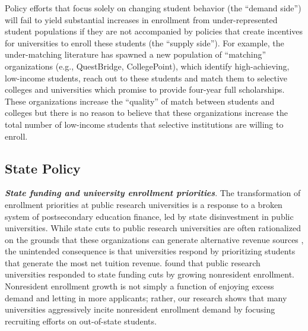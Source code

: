 \documentclass[twoside]{article}
\begin{document}
Policy efforts that focus solely on changing student behavior (the ``demand side'') will fail to yield substantial increases in enrollment from under-represented student populations if they are not accompanied by policies that create incentives for universities to enroll these students (the ``supply side'').  For example, the under-matching literature has spawned a new population of ``matching'' organizations (e.g., QuestBridge, CollegePoint), which identify high-achieving, low-income students, reach out to these students and match them to selective colleges and universities which promise to provide four-year full scholarships.  These organizations increase the ``quality'' of match between students and colleges but there is no reason to believe that these organizations increase the total number of low-income students that selective institutions are willing to enroll.

\subsection*{State Policy}

\textbf{\textit{State funding and university enrollment priorities}}. The transformation of enrollment priorities at public research universities is a response to a broken system of postsecondary education finance, led by state disinvestment in public universities.  While state cuts to public research universities are often rationalized on the grounds that these organizations can generate alternative revenue sources \citep{RN2271}, the unintended consequence is that universities respond by prioritizing students that generate the most net tuition revenue.  \cite{RN3753} found that public research universities responded to state funding cuts by growing nonresident enrollment. Nonresident enrollment growth is not simply a function of enjoying excess demand and letting in more applicants; rather, our research shows that many universities aggressively incite nonresident enrollment demand by focusing recruiting efforts on out-of-state students.
\end{document}
